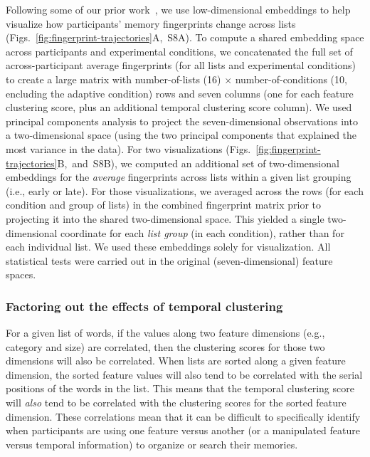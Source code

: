 \documentclass[11pt]{article}
\newcommand{\fingerprintTrajectoryRandom}{S8}
\begin{document}
Following some of our prior work~\citep{HeusEtal18a, HeusEtal21, MannEtal22},
we use low-dimensional embeddings to help visualize how participants' memory
fingerprints change across lists
(Figs.~\ref{fig:fingerprint-trajectories}A,~\fingerprintTrajectoryRandom A). To
compute a shared embedding space across participants and experimental
conditions, we concatenated the full set of across-participant average
fingerprints (for all lists and experimental conditions) to create a large
matrix with number-of-lists (16) $\times$ number-of-conditions (10, encluding
the adaptive condition) rows and seven columns (one for each feature clustering
score, plus an additional temporal clustering score column). We used principal
components analysis to project the seven-dimensional observations into a
two-dimensional space (using the two principal components that explained the
most variance in the data). For two visualizations
(Figs.~\ref{fig:fingerprint-trajectories}B,~and~\fingerprintTrajectoryRandom B),
we computed an additional set of two-dimensional embeddings for the
\textit{average} fingerprints across lists within a given list grouping (i.e.,
early or late). For those visualizations, we averaged across the rows (for each
condition and group of lists) in the combined fingerprint matrix prior to
projecting it into the shared two-dimensional space. This yielded a single
two-dimensional coordinate for each \textit{list group} (in each condition),
rather than for each individual list. We used these embeddings solely for
visualization. All statistical tests were carried out in the original
(seven-dimensional) feature spaces.

\subsubsection*{Factoring out the effects of temporal clustering}

For a given list of words, if the values along two feature dimensions (e.g.,
category and size) are correlated, then the clustering scores for those two
dimensions will also be correlated. When lists are sorted along a given feature
dimension, the sorted feature values will also tend to be correlated with the
serial positions of the words in the list. This means that the temporal
clustering score will \textit{also} tend to be correlated with the clustering
scores for the sorted feature dimension. These correlations mean that it can be
difficult to specifically identify when participants are using one feature
versus another (or a manipulated feature versus temporal information) to
organize or search their memories.
\end{document}
